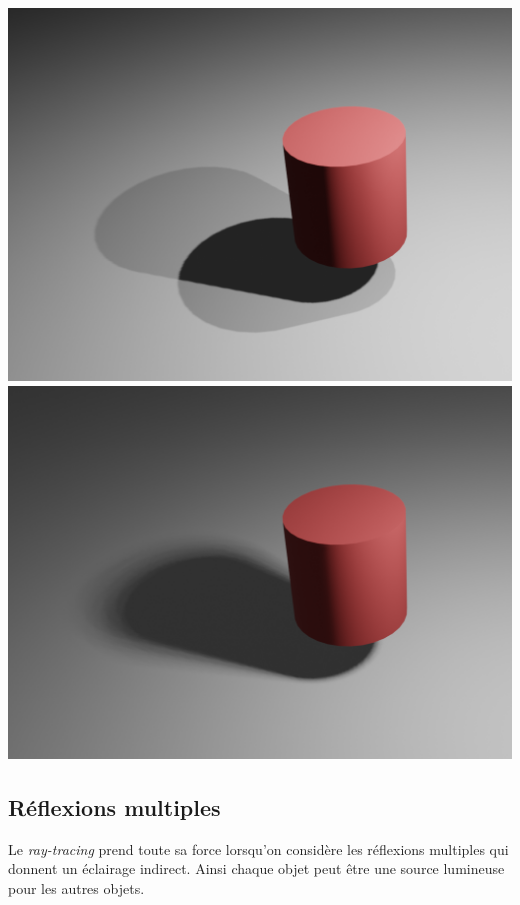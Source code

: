 \documentclass[11pt,class=report,crop=false]{standalone}
\begin{document}
\begin{center}
	\includegraphics[scale=\myscale,scale=0.20,trim={2cm 2cm 2cm 2cm},clip]{figures/ombre-deux}	
	\qquad
	\includegraphics[scale=\myscale,scale=0.20,trim={2cm 2cm 2cm 2cm},clip]{figures/ombre-surface}
\end{center}





\subsection{Réflexions multiples}

Le \emph{ray-tracing} prend toute sa force lorsqu'on considère les réflexions multiples qui donnent un éclairage indirect. Ainsi chaque objet peut être une source lumineuse pour les autres objets.
\end{document}
